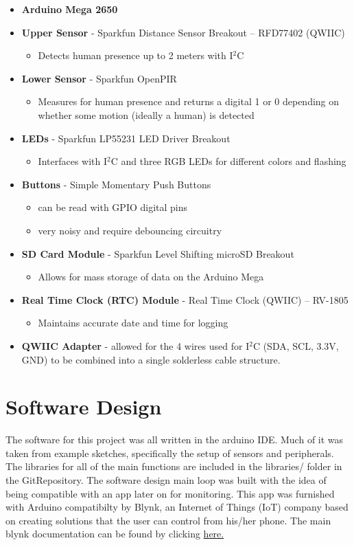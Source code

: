 \documentclass{article}
\begin{document}
\begin{itemize}
	\item \textbf{Arduino Mega 2650}
	\item \textbf{Upper Sensor} - Sparkfun Distance Sensor Breakout – RFD77402 (QWIIC)
	\begin{itemize}
		\item Detects human presence up to 2 meters with I$^2$C
	\end{itemize}
	\item \textbf{Lower Sensor} - Sparkfun OpenPIR
	\begin{itemize}
		\item Measures for human presence and returns a digital 1 or 0 depending on whether some motion (ideally a human) is detected
	\end{itemize}
	\item \textbf{LEDs} - Sparkfun LP55231 LED Driver Breakout
	\begin{itemize}
		\item Interfaces with I$^2$C and three RGB LEDs for different colors and flashing
	\end{itemize}
	\item \textbf{Buttons} - Simple Momentary Push Buttons
	\begin{itemize}
		\item can be read with GPIO digital pins
		\item very noisy and require debouncing circuitry
	\end{itemize}
	\item \textbf{SD Card Module} - Sparkfun Level Shifting microSD Breakout
	\begin{itemize}
		\item Allows for mass storage of data on the Arduino Mega
	\end{itemize}
	\item \textbf{Real Time Clock (RTC) Module} - Real Time Clock (QWIIC) – RV-1805
	\begin{itemize}
		\item Maintains accurate date and time for logging
	\end{itemize}
	\item \textbf{QWIIC Adapter} - allowed for the 4 wires used for I$^2$C (SDA, SCL, 3.3V, GND) to be combined into a single solderless cable structure.
	
\end{itemize}

\section{Software Design}
The software for this project was all written in the arduino IDE. Much of it was taken from example sketches, specifically the setup of sensors and peripherals. The libraries for all of the main functions are included in the libraries/ folder in the GitRepository. The software design main loop was built with the idea of being compatible with an app later on for monitoring. This app was furnished with Arduino compatibilty by Blynk, an Internet of Things (IoT) company based on creating solutions that the user can control from his/her phone. The main blynk documentation can be found by clicking \href{https://docs.blynk.cc/}{here.}
\end{document}

